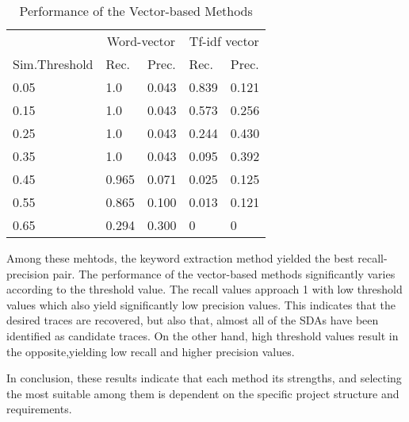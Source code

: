 \begin{table}[htb]
\centering
\caption{\label{tab:vecperf}Performance of the Vector-based Methods}
\begin{tabular}{lllll}
\toprule
  & \multicolumn{2}{c}{Word-vector} &  \multicolumn{2}{c}{Tf-idf vector} \\
  \cmidrule{2-5}
{Sim.Threshold   } & {Rec.} & {Prec.} &  {Rec.} & {Prec.}\\
\midrule
0.05    & 1.0 & 0.043 & 0.839 & 0.121 \\
0.15    & 1.0 & 0.043 & 0.573 & 0.256 \\
0.25    & 1.0 & 0.043 & 0.244 & 0.430 \\
0.35    & 1.0 & 0.043 & 0.095 & 0.392 \\
0.45    & 0.965 & 0.071 & 0.025 & 0.125 \\
0.55    & 0.865 & 0.100 & 0.013 & 0.121 \\
0.65    & 0.294 & 0.300 & 0 & 0 \\
\bottomrule
\end{tabular}
\end{table}

Among these mehtods,  the keyword extraction method yielded the best recall-precision pair.
The performance of the vector-based methods  significantly varies according to the threshold value. 
The recall values  approach 1 with low  threshold values which also yield significantly low precision values.
 This indicates that the desired traces are recovered, but also that,  almost all of the SDAs have been identified as candidate traces. 
 On the other hand, high threshold values result in the  opposite,yielding low recall and higher precision values.

In conclusion, these results indicate that each method its strengths, and selecting the most suitable among them is dependent  on the specific project structure and requirements. 

